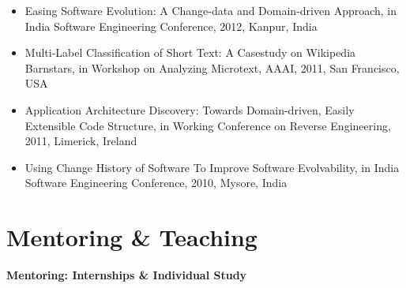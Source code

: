 \documentclass[letterpaper,11pt]{article}
\begin{document}
\begin{itemize}
  \vspace{-5pt}\item\small{Easing Software Evolution: A Change-data and Domain-driven Approach, in India Software Engineering Conference, 2012, Kanpur, India}

  \vspace{-5pt}\item\small{Multi-Label Classification of Short Text: A Casestudy on Wikipedia Barnstars, in Workshop on Analyzing Microtext, AAAI, 2011, San Francisco, USA}

  \vspace{-5pt}\item\small{Application Architecture Discovery: Towards Domain-driven, Easily Extensible Code Structure, in Working Conference on Reverse Engineering, 2011, Limerick, Ireland}

  \vspace{-5pt}\item\small{Using Change History of Software To Improve Software Evolvability, in India Software Engineering Conference, 2010, Mysore, India}

\end{itemize}


\section{Mentoring \& Teaching}

\textbf{Mentoring: Internships \& Individual Study} 
\end{document}
